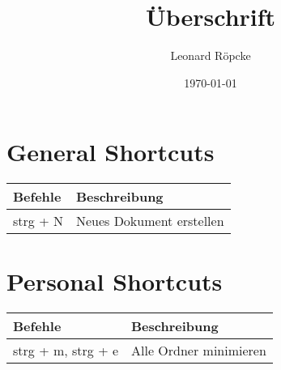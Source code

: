 \documentclass[12pt,a4paper]{article}
\title{Überschrift}
\author{Leonard Röpcke}
\date{\today}
\begin{document}
\maketitle

\begin{center}
    
    \section*{General Shortcuts}
    \begin{tabular}{|p{6cm}||p{6cm}|}
        \hline
        Befehle & Beschreibung \\
        \hline
        strg + N & Neues Dokument erstellen \\
        \hline
    \end{tabular}
    
    
    \section*{Personal Shortcuts}
    \begin{tabular}{|p{6cm}||p{6cm}|}
        \hline
        Befehle & Beschreibung \\
        \hline
        strg + m, strg + e & Alle Ordner minimieren \\
        \hline
    \end{tabular}
    
\end{center}
    
\end{document}
